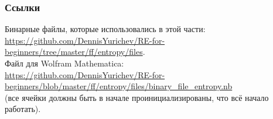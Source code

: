 \subsubsection{Ссылки}

Бинарные файлы, которые использовались в этой части:\\
\url{https://github.com/DennisYurichev/RE-for-beginners/tree/master/ff/entropy/files}.\\
Файл для Wolfram Mathematica: \\
\url{https://github.com/DennisYurichev/RE-for-beginners/blob/master/ff/entropy/files/binary_file_entropy.nb} \\
(все ячейки должны быть в начале проинициализированы, что всё начало работать).

